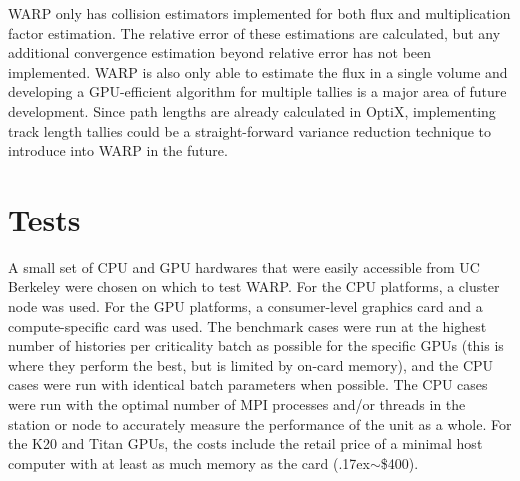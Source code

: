 \documentclass[preprint,12pt]{elsarticle}
\begin{document}
WARP only has collision estimators implemented for both flux and multiplication factor estimation.  The relative error of these estimations are calculated, but any additional convergence estimation beyond relative error has not been implemented.  WARP is also only able to estimate the flux in a single volume and developing a GPU-efficient algorithm for multiple tallies is a major area of future development.  Since path lengths are already calculated in OptiX, implementing track length tallies could be a straight-forward variance reduction technique to introduce into WARP in the future.

\section{Tests}
\label{sec:tests}

A small set of CPU and GPU hardwares that were easily accessible from UC Berkeley were chosen on which to test WARP.  For the CPU platforms, a cluster node was used.  For the GPU platforms, a consumer-level graphics card and a compute-specific card was used. The benchmark cases were run at the highest number of histories per criticality batch as possible for the specific GPUs (this is where they perform the best, but is limited by on-card memory), and the CPU cases were run with identical batch parameters when possible.  The CPU cases were run with the optimal number of MPI processes and/or threads in the station or node to accurately measure the performance of the unit as a whole.  For the K20 and Titan GPUs, the costs include the retail price of a minimal host computer with at least as much memory as the card ({\raise.17ex\hbox{$\scriptstyle\sim$}}\$400).  
\end{document}
